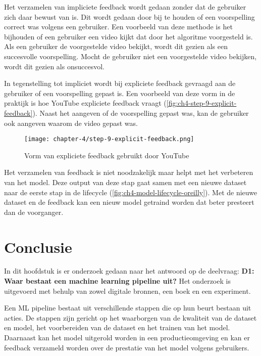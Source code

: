 Het verzamelen van impliciete feedback wordt gedaan zonder dat de gebruiker zich daar bewust van is. Dit wordt gedaan door bij te houden of een voorspelling correct was volgens een gebruiker. Een voorbeeld van deze methode is het bijhouden of een gebruiker een video kijkt dat door het algoritme voorgesteld is. Als een gebruiker de voorgestelde video bekijkt, wordt dit gezien als een succesvolle voorspelling. Mocht de gebruiker niet een voorgestelde video bekijken, wordt dit gezien als onsuccesvol.

In tegenstelling tot impliciet wordt bij expliciete feedback gevraagd aan de gebruiker of een voorspelling gepast is. Een voorbeeld van deze vorm in de praktijk is hoe YouTube expliciete feedback vraagt (\autoref{fig:ch4-step-9-explicit-feedback}). Naast het aangeven of de voorspelling gepast was, kan de gebruiker ook aangeven waarom de video gepast was.

\newpage

\begin{figure}[hbt!]
  \centering
  \texttt{[image: chapter-4/step-9-explicit-feedback.png]}
  \caption{Vorm van expliciete feedback gebruikt door YouTube}
  \label{fig:ch4-step-9-explicit-feedback}
\end{figure}

Het verzamelen van feedback is niet noodzakelijk maar helpt met het verbeteren van het model. Deze output van deze stap gaat samen met een nieuwe dataset naar de eerste stap in de lifecycle (\autoref{fig:ch4-model-lifecycle-oreilly}). Met de nieuwe dataset en de feedback kan een nieuw model getraind worden dat beter presteert dan de voorganger.

\section{Conclusie}\label{sec:ch4-conclusie}
In dit hoofdstuk is er onderzoek gedaan naar het antwoord op de deelvraag: \textbf{D1: Waar bestaat een machine learning pipeline uit?} Het onderzoek is uitgevoerd met behulp van zowel digitale bronnen, een boek en een experiment.

Een ML pipeline bestaat uit verschillende stappen die op hun beurt bestaan uit acties. De stappen zijn gericht op het waarborgen van de kwaliteit van de dataset en model, het voorbereiden van de dataset en het trainen van het model. Daarnaast kan het model uitgerold worden in een productieomgeving en kan er feedback verzameld worden over de prestatie van het model volgens gebruikers.

